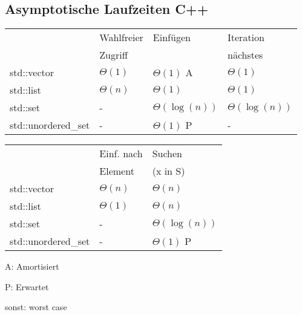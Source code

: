 \begin{sectionbox}
\subsection{Asymptotische Laufzeiten C++}\medskip

\begin{tabular*}{\columnwidth}{@{\extracolsep\fill}llll@{}}
        & Wahlfreier & Einfügen & Iteration  \\ 
        & Zugriff & & nächstes\\ \cmrule
    std::vector & $\Theta(1)$ & $\Theta(1)$ A & $\Theta(1)$  \\
    std::list & $\Theta(n)$ & $\Theta(1)$ &  $\Theta(1)$  \\
    std::set & - & $\Theta(\log(n))$  & $\Theta(\log(n))$ \\
    std::unordered\_set & - & $\Theta(1)$ P & -  \\
\end{tabular*}\par\smallskip

\begin{tabular*}{\columnwidth}{@{\extracolsep\fill}lll@{}}
    &  Einf. nach & Suchen \\ 
    &  Element & (x in S) \\ \cmrule
std::vector & $\Theta(n)$ & $\Theta(n)$ \\
std::list  &  $\Theta(1)$ &  $\Theta(n)$ \\
std::set & - & $\Theta(\log(n))$\\
std::unordered\_set & - & $\Theta(1)$ P \\
\end{tabular*}\par\smallskip

A: Amortisiert\par
P: Erwartet\par
sonst: worst case
\end{sectionbox}

